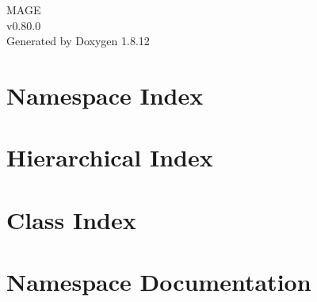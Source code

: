 \documentclass[twoside]{book}
\newcommand{\+}{\discretionary{\mbox{\scriptsize$\hookleftarrow$}}{}{}}
\newcommand{\clearemptydoublepage}{%
  \newpage{\pagestyle{empty}\cleardoublepage}%
}
\begin{document}
\hypersetup{pageanchor=false,
             bookmarksnumbered=true,
             pdfencoding=unicode
            }
\begin{titlepage}
\vspace*{7cm}
\begin{center}%
{\Large M\+A\+GE \\[1ex]\large v0.\+80.\+0 }\\
\vspace*{1cm}
{\large Generated by Doxygen 1.8.12}\\
\end{center}
\end{titlepage}
\clearemptydoublepage
{}
\tableofcontents
\clearemptydoublepage
{}
\hypersetup{pageanchor=true}

\chapter{Namespace Index}

\chapter{Hierarchical Index}

\chapter{Class Index}

\chapter{Namespace Documentation}


\end{document}
